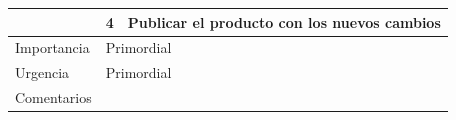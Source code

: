 \begin{table}[th!]
\begin{tabular}{|l|l|l|}
		& 4                                                                           & Publicar el producto con los nuevos cambios                                                                                         \\ \hline
		Importancia                                                                  & \multicolumn{2}{l|}{Primordial}                                                                                                                                                                                   \\ \hline
		Urgencia                                                                     & \multicolumn{2}{l|}{Primordial}                                                                                                                                                                                   \\ \hline
		Comentarios                                                                  & \multicolumn{2}{l|}{}                                                                                                                                                                                             \\ \hline
	\end{tabular}
\end{table}
\newpage


